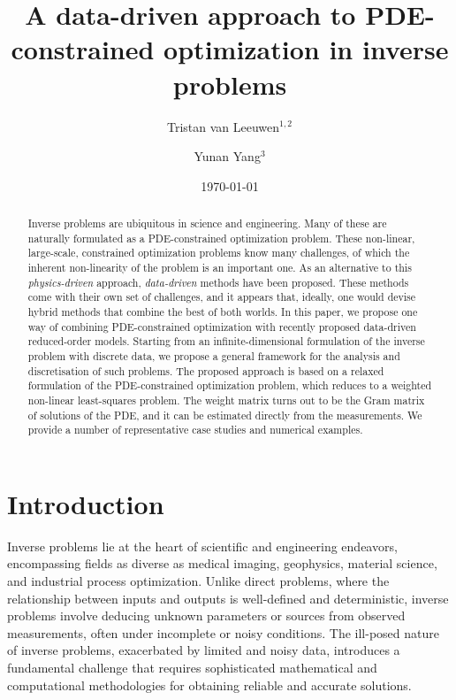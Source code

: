 \documentclass[12pt]{amsart}
\title{A data-driven approach to PDE-constrained optimization in inverse problems}
\author{Tristan van Leeuwen$^{1,2}$}
\author{Yunan Yang$^3$}
\date{\today}
\begin{document}
\maketitle

\begin{abstract}
Inverse problems are ubiquitous in science and engineering. Many of these are naturally formulated as a PDE-constrained optimization problem. These non-linear, large-scale, constrained optimization problems know many challenges, of which the inherent non-linearity of the problem is an important one. As an alternative to this \emph{physics-driven} approach, \emph{data-driven} methods have been proposed. These methods come with their own set of challenges, and it appears that, ideally, one would devise hybrid methods that combine the best of both worlds. In this paper, we propose one way of combining PDE-constrained optimization with recently proposed data-driven reduced-order models. Starting from an infinite-dimensional formulation of the inverse problem with discrete data, we propose a general framework for the analysis and discretisation of such problems. The proposed approach is based on a relaxed formulation of the PDE-constrained optimization problem, which reduces to a weighted non-linear least-squares problem. The weight matrix turns out to be the Gram matrix of solutions of the PDE, and it can be estimated directly from the measurements. We provide a number of representative case studies and numerical examples.
\end{abstract}

\section{Introduction}
Inverse problems lie at the heart of scientific and engineering endeavors, encompassing fields as diverse as medical imaging, geophysics, material science, and industrial process optimization. Unlike direct problems, where the relationship between inputs and outputs is well-defined and deterministic, inverse problems involve deducing unknown parameters or sources from observed measurements, often under incomplete or noisy conditions. The ill-posed nature of inverse problems, exacerbated by limited and noisy data, introduces a fundamental challenge that requires sophisticated mathematical and computational methodologies for obtaining reliable and accurate solutions.
\end{document}

